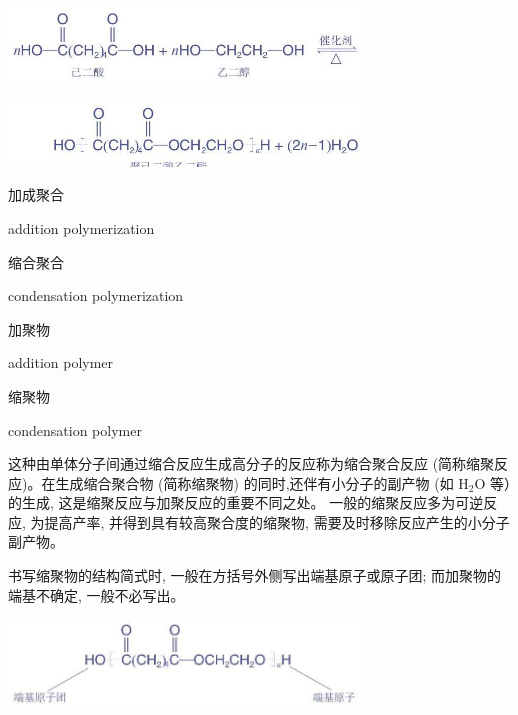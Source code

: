 \documentclass[10pt]{article}
\begin{document}
\begin{center}
\includegraphics[max width=0.7\textwidth]{images/0190efc5-b58a-7c43-bfb0-e0a030df9cfd_138_233327.jpg}
\end{center}

\begin{center}
\includegraphics[max width=0.7\textwidth]{images/0190efc5-b58a-7c43-bfb0-e0a030df9cfd_138_758298.jpg}
\end{center}

\begin{mdframed}

加成聚合

addition polymerization

缩合聚合

condensation polymerization

加聚物

addition polymer

缩聚物

condensation polymer

\end{mdframed}

这种由单体分子间通过缩合反应生成高分子的反应称为缩合聚合反应 (简称缩聚反应)。在生成缩合聚合物 (简称缩聚物) 的同时,还伴有小分子的副产物 (如 \({\mathrm{H}}_{2}\mathrm{O}\) 等）的生成, 这是缩聚反应与加聚反应的重要不同之处。 一般的缩聚反应多为可逆反应, 为提高产率, 并得到具有较高聚合度的缩聚物, 需要及时移除反应产生的小分子副产物。

书写缩聚物的结构简式时, 一般在方括号外侧写出端基原子或原子团; 而加聚物的端基不确定, 一般不必写出。

\begin{center}
\includegraphics[max width=0.7\textwidth]{images/0190efc5-b58a-7c43-bfb0-e0a030df9cfd_138_559632.jpg}
\end{center}
\end{document}
